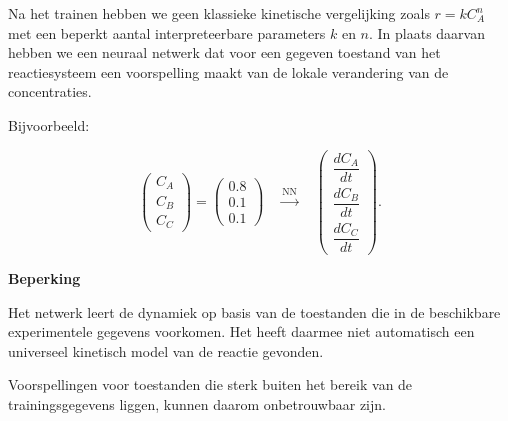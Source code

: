 \documentclass{ximera}
\begin{document}
\begin{conclusion} \text{ }

Na het trainen hebben we geen klassieke kinetische vergelijking zoals $r = k C_A^n$ met een beperkt aantal interpreteerbare parameters \(k\) en \(n\). In plaats daarvan hebben we een neuraal netwerk dat voor een gegeven toestand van het reactiesysteem een voorspelling maakt van de lokale verandering van de concentraties.

Bijvoorbeeld:

\[
\begin{pmatrix}
C_A \\
C_B \\
C_C
\end{pmatrix}
=
\begin{pmatrix}
0.8 \\
0.1 \\
0.1
\end{pmatrix}
\quad
\xrightarrow{\text{NN}}
\quad
\begin{pmatrix}
\dfrac{dC_A}{dt} \\
\dfrac{dC_B}{dt} \\
\dfrac{dC_C}{dt}
\end{pmatrix}.
\]
\end{conclusion}


\begin{remark} \textbf{Beperking}

Het netwerk leert de dynamiek op basis van de toestanden die in de
beschikbare experimentele gegevens voorkomen. Het heeft daarmee niet automatisch een universeel kinetisch model van de reactie gevonden.

Voorspellingen voor toestanden die sterk buiten het bereik van de
trainingsgegevens liggen, kunnen daarom onbetrouwbaar zijn.
\end{remark}
\end{document}
